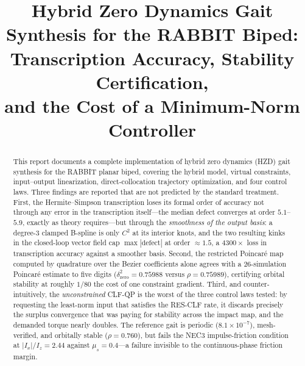 \documentclass[10pt,conference]{IEEEtran}
\begin{document}
\title{Hybrid Zero Dynamics Gait Synthesis for the RABBIT Biped:\\
Transcription Accuracy, Stability Certification,\\
and the Cost of a Minimum-Norm Controller}

\author{
}

\maketitle

\begin{abstract}
This report documents a complete implementation of hybrid zero dynamics (HZD)
gait synthesis for the RABBIT planar biped, covering the hybrid model, virtual
constraints, input--output linearization, direct-collocation trajectory
optimization, and four control laws. Three findings are reported that are not
predicted by the standard treatment. First, the Hermite--Simpson transcription
loses its formal order of accuracy not through any error in the transcription
itself---the median defect converges at order $5.1$--$5.9$, exactly as
theory requires---but through the \emph{smoothness of the output basis}: a
degree-3 clamped B-spline is only $C^2$ at its interior knots, and the two
resulting kinks in the closed-loop vector field cap $\max|\text{defect}|$ at
order ${\approx}1.5$, a $4300\times$ loss in transcription accuracy against a
smoother basis. Second, the restricted Poincar\'e map computed by quadrature
over the Bezier coefficients alone agrees with a 26-simulation Poincar\'e
estimate to five digits ($\delta^2_{\mathrm{zero}}=0.75988$ versus
$\rho=0.75989$), certifying orbital stability at roughly $1/80$ the cost of one
constraint gradient. Third, and counter-intuitively, the \emph{unconstrained}
CLF-QP is the worst of the three control laws tested: by requesting the
least-norm input that satisfies the RES-CLF rate, it discards precisely the
surplus convergence that was paying for stability across the impact map, and
the demanded torque nearly doubles. The reference gait is periodic
($8.1\times10^{-7}$), mesh-verified, and orbitally stable ($\rho = 0.760$),
but fails the NEC3 impulse-friction condition at $|I_x|/I_z = 2.44$ against
$\mu_s = 0.4$---a failure invisible to the continuous-phase friction margin.
\end{abstract}
\end{document}
